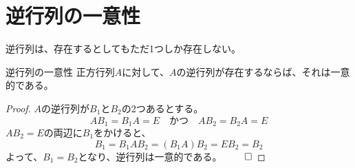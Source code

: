 \documentclass[../../../topic_linear-algebra]{subfiles}
\begin{document}
\sectionline
\section{逆行列の一意性}

逆行列は、存在するとしてもただ1つしか存在しない。

\begin{theorem*}{逆行列の一意性}
  正方行列$A$に対して、$A$の逆行列が存在するならば、それは一意的である。
\end{theorem*}

\begin{proof}
  $A$の逆行列が$B_1$と$B_2$の2つあるとする。
  \begin{equation*}
    AB_1 = B_1A = E \quad \text{かつ} \quad AB_2 = B_2A = E
  \end{equation*}
  $AB_2 = E$の両辺に$B_1$をかけると、
  \begin{equation*}
    B_1 = B_1 AB_2 = (B_1 A) B_2 = E B_2 = B_2
  \end{equation*}
  よって、$B_1 = B_2$となり、逆行列は一意的である。 $\qed$
\end{proof}
\end{document}
